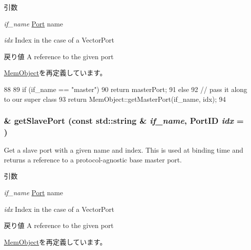 \begin{DoxyParams}{引数}
\item[{\em if\_\-name}]\hyperlink{classPort}{Port} name \item[{\em idx}]Index in the case of a VectorPort\end{DoxyParams}
\begin{DoxyReturn}{戻り値}
A reference to the given port 
\end{DoxyReturn}


\hyperlink{classMemObject_adc4e675e51defbdd1e354dac729d0703}{MemObject}を再定義しています。


\begin{DoxyCode}
88 {
89     if (if_name == "master")
90         return masterPort;
91     else
92         // pass it along to our super class
93         return MemObject::getMasterPort(if_name, idx);
94 }
\end{DoxyCode}
\hypertarget{classBridge_ac918a145092d7514ebc6dbd952dceafb}{
\subsubsection[{getSlavePort}]{ \& getSlavePort (const std::string \& {\em if\_\-name}, \/  {\bf PortID} {\em idx} = {})}}
\label{classBridge_ac918a145092d7514ebc6dbd952dceafb}
Get a slave port with a given name and index. This is used at binding time and returns a reference to a protocol-\/agnostic base master port.


\begin{DoxyParams}{引数}
\item[{\em if\_\-name}]\hyperlink{classPort}{Port} name \item[{\em idx}]Index in the case of a VectorPort\end{DoxyParams}
\begin{DoxyReturn}{戻り値}
A reference to the given port 
\end{DoxyReturn}


\hyperlink{classMemObject_ac918a145092d7514ebc6dbd952dceafb}{MemObject}を再定義しています。


